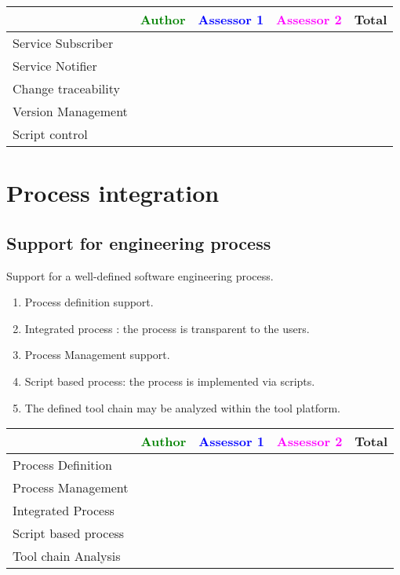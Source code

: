 \begin{tabular}{|l | c | c | c | c|} \hline
  & \textcolor{green}{Author} & \textcolor{blue}{Assessor 1} &  \textcolor{magenta}{Assessor 2} & Total \\
  \hline Service Subscriber&
  &                 &                  &\\
  \hline Service Notifier &
  &                 &                  &\\
  \hline Change traceability &
  &                 &                  &\\
  \hline Version Management &
  &                 &                  &\\
  \hline Script control &
  &                 &                  &\\
  \hline
\end{tabular}


\section{Process integration}
\subsection{Support for engineering process}
Support for a well-defined software engineering process. 
\begin{enumerate}
\item Process definition support.
\item Integrated process : the process is transparent to the users.
\item Process Management support.
\item Script based process: the process is implemented via scripts.
\item The defined tool chain  may be analyzed within the tool platform.
\end{enumerate}

\begin{tabular}{|l | c | c | c | c|} \hline
  & \textcolor{green}{Author} & \textcolor{blue}{Assessor 1} &  \textcolor{magenta}{Assessor 2} & Total \\
  \hline Process Definition &
  &                 &                  &\\
  \hline Process Management &
  &                 &                  &\\
  \hline Integrated Process &
  &                 &                  &\\
  \hline Script based process &
  &                 &                  &\\
  \hline Tool chain Analysis &
  &                 &                  &\\
  \hline
\end{tabular}



